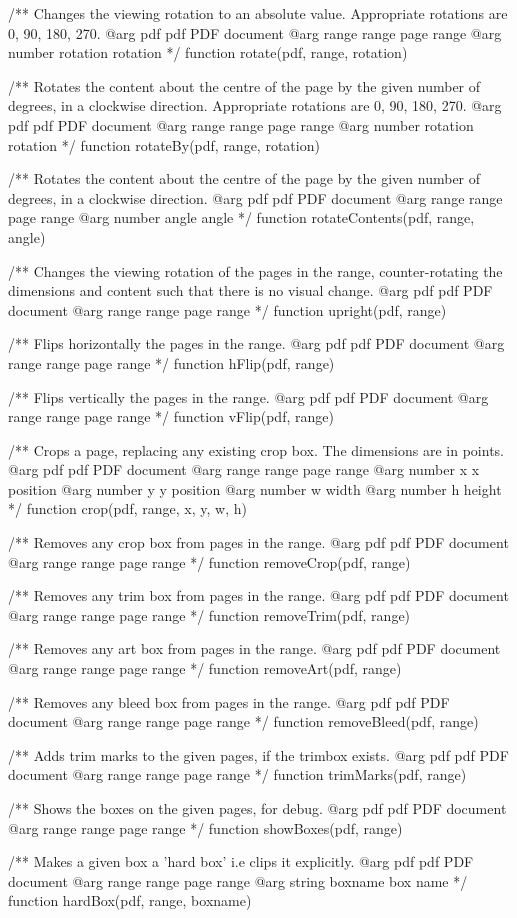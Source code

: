 /** Changes the viewing rotation to an absolute value. Appropriate rotations
are 0, 90, 180, 270.
@arg {pdf} pdf PDF document
@arg {range} range page range
@arg {number} rotation rotation */
function rotate(pdf, range, rotation) {}

/** Rotates the content about the centre of the page by the given number of
degrees, in a clockwise direction. Appropriate rotations
are 0, 90, 180, 270.
@arg {pdf} pdf PDF document
@arg {range} range page range
@arg {number} rotation rotation */
function rotateBy(pdf, range, rotation) {}

/** Rotates the content about the centre of the page by the given number of
degrees, in a clockwise direction.
@arg {pdf} pdf PDF document
@arg {range} range page range
@arg {number} angle angle */
function rotateContents(pdf, range, angle) {}

/** Changes the viewing rotation of the pages in the range, counter-rotating
the dimensions and content such that there is no visual change.
@arg {pdf} pdf PDF document
@arg {range} range page range */
function upright(pdf, range) {}

/** Flips horizontally the pages in the range.
@arg {pdf} pdf PDF document
@arg {range} range page range */
function hFlip(pdf, range) {}

/** Flips vertically the pages in the range.
@arg {pdf} pdf PDF document
@arg {range} range page range */
function vFlip(pdf, range) {}

/** Crops a page, replacing any existing crop box. The dimensions are in
points.
@arg {pdf} pdf PDF document
@arg {range} range page range
@arg {number} x x position
@arg {number} y y position
@arg {number} w width
@arg {number} h height */
function crop(pdf, range, x, y, w, h) {}

/** Removes any crop box from pages in the range.
@arg {pdf} pdf PDF document
@arg {range} range page range */
function removeCrop(pdf, range) {}

/** Removes any trim box from pages in the range.
@arg {pdf} pdf PDF document
@arg {range} range page range */
function removeTrim(pdf, range) {}

/** Removes any art box from pages in the range.
@arg {pdf} pdf PDF document
@arg {range} range page range */
function removeArt(pdf, range) {}

/** Removes any bleed box from pages in the range.
@arg {pdf} pdf PDF document
@arg {range} range page range */
function removeBleed(pdf, range) {}

/** Adds trim marks to the given pages, if the trimbox exists.
@arg {pdf} pdf PDF document
@arg {range} range page range */
function trimMarks(pdf, range) {}

/** Shows the boxes on the given pages, for debug.
@arg {pdf} pdf PDF document
@arg {range} range page range */
function showBoxes(pdf, range) {}

/** Makes a given box a 'hard box' i.e clips it explicitly.
@arg {pdf} pdf PDF document
@arg {range} range page range
@arg {string} boxname box name */
function hardBox(pdf, range, boxname) {}

